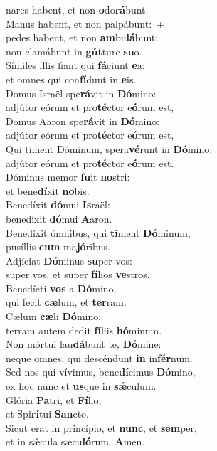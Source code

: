 \evenverse nares habent, et non \textbf{o}do\textbf{rá}bunt.\\
\oddverse Manus habent, et non palpábunt:~+\\
\oddverse  pedes habent, et non \textbf{am}bu\textbf{lá}bunt:~\*\\
\oddverse non clamábunt in \textbf{gút}ture \textbf{su}o.\\
\evenverse Símiles illis fiant qui \textbf{fá}ciunt \textbf{e}a:~\*\\
\evenverse et omnes qui con\textbf{fí}dunt in \textbf{e}is.\\
\oddverse Domus Israël spe\textbf{rá}vit in \textbf{Dó}mino:~\*\\
\oddverse adjútor eórum et pro\textbf{té}ctor e\textbf{ó}rum est,\\
\evenverse Domus Aaron spe\textbf{rá}vit in \textbf{Dó}mino:~\*\\
\evenverse adjútor eórum et pro\textbf{té}ctor e\textbf{ó}rum est,\\
\oddverse Qui timent Dóminum, spera\textbf{vé}runt in \textbf{Dó}mino:~\*\\
\oddverse adjútor eórum et pro\textbf{té}ctor e\textbf{ó}rum est.\\
\evenverse Dóminus memor \textbf{fu}it \textbf{no}stri:~\*\\
\evenverse et bene\textbf{dí}xit \textbf{no}bis:\\
\oddverse Benedíxit \textbf{dó}mui \textbf{Is}raël:~\*\\
\oddverse benedíxit \textbf{dó}mui \textbf{A}aron.\\
\evenverse Benedíxit ómnibus, qui \textbf{ti}ment \textbf{Dó}minum,~\*\\
\evenverse pusíllis \textbf{cum} ma\textbf{jó}ribus.\\
\oddverse Adjíciat \textbf{Dó}minus \textbf{su}per vos:~\*\\
\oddverse super vos, et super \textbf{fí}lios \textbf{ve}stros.\\
\evenverse Benedícti \textbf{vos} a \textbf{Dó}mino,~\*\\
\evenverse qui fecit \textbf{cæ}lum, et \textbf{ter}ram.\\
\oddverse Cælum \textbf{cæ}li \textbf{Dó}mino:~\*\\
\oddverse terram autem dedit \textbf{fí}liis \textbf{hó}minum.\\
\evenverse Non mórtui lau\textbf{dá}bunt te, \textbf{Dó}mine:~\*\\
\evenverse neque omnes, qui descéndunt \textbf{in} in\textbf{fér}num.\\
\oddverse Sed nos qui vívimus, bene\textbf{dí}cimus \textbf{Dó}mino,~\*\\
\oddverse ex hoc nunc et \textbf{us}que in \textbf{sǽ}culum.\\
\evenverse Glória \textbf{Pa}tri, et \textbf{Fí}lio,~\*\\
\evenverse et Spi\textbf{rí}tui \textbf{San}cto.\\
\oddverse Sicut erat in princípio, et \textbf{nunc}, et \textbf{sem}per,~\*\\
\oddverse et in sǽcula sæcu\textbf{ló}rum. \textbf{A}men.\\
